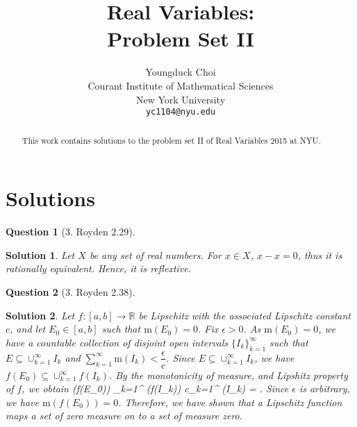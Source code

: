 \documentclass{article} %
\title{Real Variables: \\
Problem Set II}
\author{
Youngduck Choi \\
Courant Institute of Mathematical Sciences \\
New York University \\
\texttt{yc1104@nyu.edu} \\
}
\def\eQb#1\eQe{\begin{eqnarray*}#1\end{eqnarray*}}
\theoremstyle{quest}
\newtheorem*{question}{Question}
\newtheorem*{solution}{Solution}
\begin{document}
\maketitle

\begin{abstract}
This work contains solutions to the problem set II of Real Variables 2015 at NYU.
\end{abstract}

\section{Solutions}

\begin{question}[3. Royden 2.29]
\end{question}
\begin{solution}
Let $X$ be any set of real numbers. For $x \in X$, $x - x = 0$, thus it is rationally equivalent.
Hence, it is reflextive.
\end{solution}

\bigskip

\begin{question}[3. Royden 2.38]
\end{question}
\begin{solution}
Let $f:[a,b] \to \mathbb{R}$ be Lipschitz with the associated Lipschitz constant $c$,
and let $E_0 \in [a,b]$ such that $\mathrm{m}(E_0) = 0$.
Fix $\epsilon > 0$. As $\mathrm{m}(E_0) = 0$, we have a countable collection of disjoint 
open intervals $\{ I_k \}_{k=1}^{\infty}$ such that $E \subseteq 
\cup_{k=1}^{\infty} I_k$ and $\sum_{k=1}^{\infty}
\mathrm{m}(I_k) < \dfrac{\epsilon}{c}$. Since $E \subseteq \cup_{k=1}^{\infty} 
I_k$, we have $f(E_0) \subseteq \cup_{k=1}^{\infty} f(I_k)$. By the monotonicity
of measure, and Lipshitz property of $f$, we obtain
\eQb
\mathrm{m}(f(E_0)) \leq \sum_{k=1}^{\infty} (f(I_k)) 
\leq c\sum_{k=1}^{\infty} (I_k) = \epsilon.
\eQe
Since $\epsilon$ is arbitrary, we have $\mathrm{m}(f(E_0)) = 0$. Therefore, we have shown that
a Lipschitz function maps a set of zero measure on to a set of measure zero. 
\end{solution}

\bigskip
\end{document}
